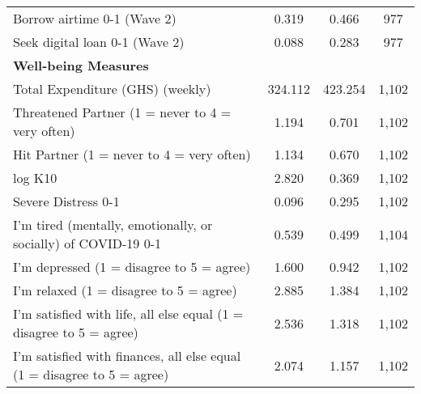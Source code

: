 \begin{tabular}{lccc}
Borrow airtime 0-1 (Wave 2) & 0.319 & 0.466 & 977 \\ 
Seek digital loan 0-1 (Wave 2) & 0.088 & 0.283 & 977 \\ 
\textbf{Well-being Measures} & & & \\ 
Total Expenditure (GHS) (weekly) & 324.112 & 423.254 & 1,102 \\ 
Threatened Partner (1 = never to 4 = very often) & 1.194 & 0.701 & 1,102 \\ 
Hit Partner (1 = never to 4 = very often) & 1.134 & 0.670 & 1,102 \\ 
log K10 & 2.820 & 0.369 & 1,102 \\ 
Severe Distress 0-1 & 0.096 & 0.295 & 1,102 \\ 
I'm tired (mentally, emotionally, or socially) of COVID-19 0-1 & 0.539 & 0.499 & 1,104 \\ 
I'm depressed (1 = disagree to 5 = agree) & 1.600 & 0.942 & 1,102 \\ 
I'm relaxed (1 = disagree to 5 = agree) & 2.885 & 1.384 & 1,102 \\ 
I'm satisfied with life, all else equal (1 = disagree to 5 = agree) & 2.536 & 1.318 & 1,102 \\ 
I'm satisfied with finances, all else equal (1 = disagree to 5 = agree) & 2.074 & 1.157 & 1,102 \\ 
\hline\hline
\end{tabular}
